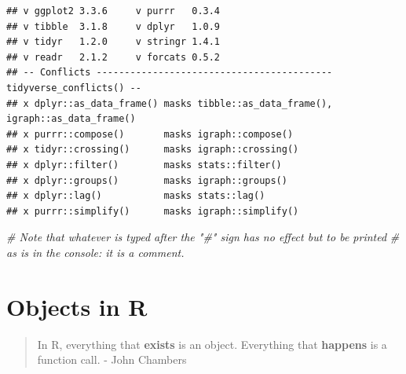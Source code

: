 \documentclass[
]{book}
\newenvironment{Shaded}{\begin{snugshade}}{\end{snugshade}}
\newcommand{\CommentTok}[1]{\textcolor[rgb]{0.56,0.35,0.01}{\textit{#1}}}
\begin{document}
\begin{verbatim}
## v ggplot2 3.3.6     v purrr   0.3.4
## v tibble  3.1.8     v dplyr   1.0.9
## v tidyr   1.2.0     v stringr 1.4.1
## v readr   2.1.2     v forcats 0.5.2
## -- Conflicts ------------------------------------------ tidyverse_conflicts() --
## x dplyr::as_data_frame() masks tibble::as_data_frame(), igraph::as_data_frame()
## x purrr::compose()       masks igraph::compose()
## x tidyr::crossing()      masks igraph::crossing()
## x dplyr::filter()        masks stats::filter()
## x dplyr::groups()        masks igraph::groups()
## x dplyr::lag()           masks stats::lag()
## x purrr::simplify()      masks igraph::simplify()
\end{verbatim}

\begin{Shaded}
\begin{Highlighting}[]
\CommentTok{\# Note that whatever is typed after the "\#" sign has no effect but to be printed}
\CommentTok{\# as is in the console: it is a comment.}
\end{Highlighting}
\end{Shaded}

\hypertarget{objects-in-r}{%
\section{Objects in R}\label{objects-in-r}}

\begin{quote}
In R, everything that \textbf{exists} is an object. Everything that \textbf{happens} is a function call.
- John Chambers
\end{quote}
\end{document}
